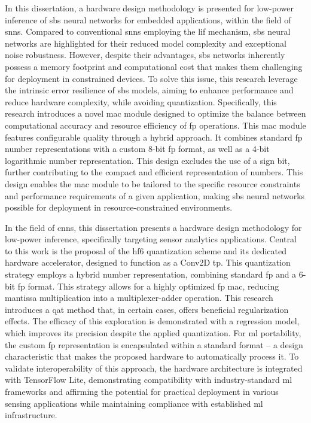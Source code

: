\documentclass{article}
\begin{document}
In this dissertation, a hardware design methodology is presented for low-power inference of \gls{sbs} neural networks for embedded applications, within the field of \glspl{snn}. Compared to conventional \glspl{snn} employing the \gls{lif} mechanism, \gls{sbs} neural networks are highlighted for their reduced model complexity and exceptional noise robustness. However, despite their advantages, \gls{sbs} networks inherently possess a memory footprint and computational cost that makes them challenging for deployment in constrained devices. To solve this issue, this research leverage the intrinsic error resilience of \gls{sbs} models, aiming to enhance performance and reduce hardware complexity, while avoiding quantization. Specifically, this research introduces a novel \gls{mac} module designed to optimize the balance between computational accuracy and resource efficiency of \gls{fp} operations. This \gls{mac} module features configurable quality through a hybrid approach. It combines standard \gls{fp} number representations with a custom 8-bit \gls{fp} format, as well as a 4-bit logarithmic number representation. This design excludes the use of a sign bit, further contributing to the compact and efficient representation of numbers. This design enables the \gls{mac} module to be tailored to the specific resource constraints and performance requirements of a given application, making \gls{sbs} neural networks possible for deployment in resource-constrained environments.

In the field of \glspl{cnn}, this dissertation presents a hardware design methodology for low-power inference, specifically targeting sensor analytics applications. Central to this work is the proposal of the \gls{hf6} quantization scheme and its dedicated hardware accelerator, designed to function as a Conv2D \gls{tp}. This quantization strategy employs a hybrid number representation, combining standard \gls{fp} and a 6-bit \gls{fp} format. This strategy allows for a highly optimized \gls{fp} \gls{mac}, reducing mantissa multiplication into a multiplexer-adder operation. This research introduces a \gls{qat} method that, in certain cases, offers beneficial regularization effects. The efficacy of this exploration is demonstrated with a regression model, which improves its precision despite the applied quantization. For \gls{ml} portability, the custom \gls{fp} representation is encapsulated within a standard format -- a design characteristic that makes the proposed hardware to automatically process it. To validate interoperability of this approach, the hardware architecture is integrated with TensorFlow Lite, demonstrating compatibility with industry-standard \gls{ml} frameworks and affirming the potential for practical deployment in various sensing applications while maintaining compliance with established \gls{ml} infrastructure.
\end{document}

